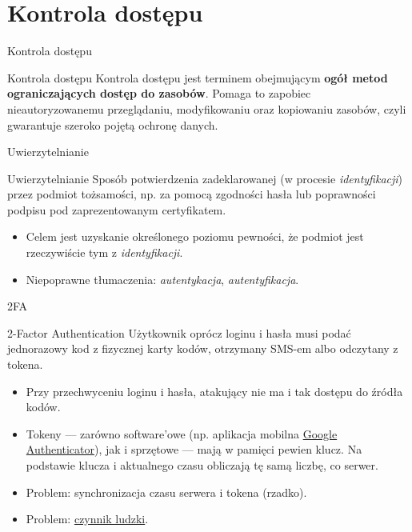\section{Kontrola dostępu}

\begin{frame}{Kontrola dostępu}
		\begin{alertblock}{Kontrola dostępu}
			Kontrola dostępu jest terminem obejmującym \textbf{ogół metod ograniczających dostęp do zasobów}.
			Pomaga to zapobiec nieautoryzowanemu przeglądaniu, modyfikowaniu oraz kopiowaniu zasobów, czyli gwarantuje szeroko pojętą ochronę danych. 
		\end{alertblock}		
\end{frame}


\begin{frame}{Uwierzytelnianie}
	
	\begin{alertblock}{Uwierzytelnianie}
		Sposób potwierdzenia zadeklarowanej (w procesie \emph{identyfikacji}) przez podmiot tożsamości, np. za pomocą zgodności hasła lub poprawności podpisu pod zaprezentowanym certyfikatem.
	\end{alertblock}
	
	\begin{itemize}
		\item Celem jest uzyskanie określonego poziomu pewności, że podmiot jest rzeczywiście tym z \emph{identyfikacji}.
		\item Niepoprawne tłumaczenia: \emph{autentykacja}, \emph{autentyfikacja}.
	\end{itemize}

\end{frame}

\begin{frame}{2FA}
	
	\begin{alertblock}{2-Factor Authentication}
		Użytkownik oprócz loginu i hasła musi podać jednorazowy kod z fizycznej karty kodów, otrzymany SMS-em albo odczytany z tokena.
	\end{alertblock}
	
	\begin{itemize}
		\item Przy przechwyceniu loginu i hasła, atakujący nie ma i tak dostępu do źródła kodów.
		
		\item Tokeny — zarówno software'owe (np. aplikacja mobilna \href{https://play.google.com/store/apps/details?id=com.google.android.apps.authenticator2}{Google Authenticator}), jak i sprzętowe — mają w pamięci pewien klucz. Na podstawie klucza i aktualnego czasu obliczają tę samą liczbę, co serwer.
	
		\item Problem: synchronizacja czasu serwera i tokena (rzadko).
		
		\item Problem: \href{http://zaufanatrzeciastrona.pl/post/jak-absolutnie-nie-uzywac-tokenow/}{czynnik ludzki}.
	\end{itemize}
	
\end{frame}

